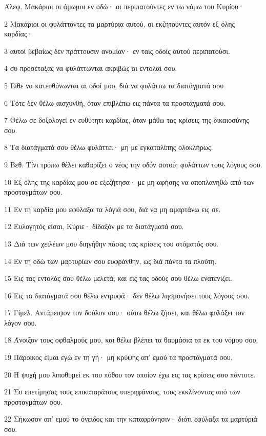 \par Άλεφ. Μακάριοι οι άμωμοι εν οδώ· οι περιπατούντες εν τω νόμω του Κυρίου·
\par 2 Μακάριοι οι φυλάττοντες τα μαρτύρια αυτού, οι εκζητούντες αυτόν εξ όλης καρδίας·
\par 3 αυτοί βεβαίως δεν πράττουσιν ανομίαν· εν ταις οδοίς αυτού περιπατούσι.
\par 4 συ προσέταξας να φυλάττωνται ακριβώς αι εντολαί σου.
\par 5 Είθε να κατευθύνωνται αι οδοί μου, διά να φυλάττω τα διατάγματά σου
\par 6 Τότε δεν θέλω αισχυνθή, όταν επιβλέπω εις πάντα τα προστάγματά σου.
\par 7 Θέλω σε δοξολογεί εν ευθύτητι καρδίας, όταν μάθω τας κρίσεις της δικαιοσύνης σου.
\par 8 Τα διατάγματά σου θέλω φυλάττει· μη με εγκαταλίπης ολοκλήρως.
\par 9 Βεθ. Τίνι τρόπω θέλει καθαρίζει ο νέος την οδόν αυτού; φυλάττων τους λόγους σου.
\par 10 Εξ όλης της καρδίας μου σε εξεζήτησα· με μη αφήσης να αποπλανηθώ από των προσταγμάτων σου.
\par 11 Εν τη καρδία μου εφύλαξα τα λόγιά σου, διά να μη αμαρτάνω εις σε.
\par 12 Ευλογητός είσαι, Κύριε· δίδαξόν με τα διατάγματά σου.
\par 13 Διά των χειλέων μου διηγήθην πάσας τας κρίσεις του στόματός σου.
\par 14 Εν τη οδώ των μαρτυρίων σου ευφράνθην, ως διά πάντα τα πλούτη.
\par 15 Εις τας εντολάς σου θέλω μελετά, και εις τας οδούς σου θέλω ενατενίζει.
\par 16 Εις τα διατάγματά σου θέλω εντρυφά· δεν θέλω λησμονήσει τους λόγους σου.
\par 17 Γίμελ. Αντάμειψον τον δούλον σου· ούτω θέλω ζήσει, και θέλω φυλάξει τον λόγον σου.
\par 18 Άνοιξον τους οφθαλμούς μου, και θέλω βλέπει τα θαυμάσια τα εκ του νόμου σου.
\par 19 Πάροικος είμαι εγώ εν τη γή· μη κρύψης απ' εμού τα προστάγματά σου.
\par 20 Η ψυχή μου λιποθυμεί εκ του πόθου τον οποίον έχω εις τας κρίσεις σου πάντοτε.
\par 21 Συ επετίμησας τους επικαταράτους υπερηφάνους, τους εκκλίνοντας από των προσταγμάτων σου.
\par 22 Σήκωσον απ' εμού το όνειδος και την καταφρόνησιν· διότι εφύλαξα τα μαρτύριά σου.
